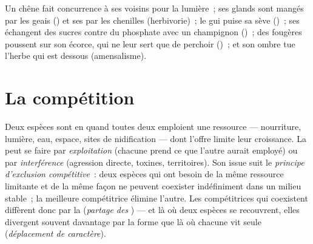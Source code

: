 \begin{example}\label{ex:b1:species-interactions:oak}
Un chêne fait concurrence à ses voisins pour la lumière~; ses glands
sont mangés par les geais () et ses  par les chenilles
(herbivorie)~; le gui puise sa sève ()~; ses  échangent
des sucres contre du phosphate avec un champignon ()~; des
fougères poussent sur son écorce, qui ne leur sert que de perchoir
()~; et son ombre tue l'herbe qui est dessous
(amensalisme).
\end{example}

\section{La compétition}

\begin{definition}\label{def:b1:species-interactions:competition}
Deux espèces sont en  quand toutes deux emploient une
ressource --- nourriture, lumière, eau, espace, sites de nidification
--- dont l'offre limite leur croissance. La  peut se faire
par \emph{exploitation} (chacune prend ce que l'autre aurait employé)
ou par \emph{interférence} (agression directe, toxines, territoires).
Son issue suit le \emph{principe d'exclusion compétitive}~: deux
espèces qui ont besoin de la même ressource limitante et de la même
façon ne peuvent coexister indéfiniment dans un milieu stable~; la
meilleure compétitrice élimine l'autre. Les compétitrices qui
coexistent diffèrent donc par la  (\emph{partage des }) --- et
là où deux espèces se recouvrent, elles divergent souvent davantage par
la forme que là où chacune vit seule (\emph{déplacement de caractère}).
\end{definition}

